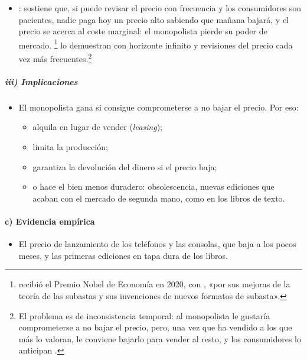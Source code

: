 \documentclass[11pt]{article}
\begin{document}
\begin{itemize}
\item {}: \textcite{Coase1972Durability} sostiene que, si puede revisar el precio con frecuencia y los consumidores son pacientes, nadie paga hoy un precio alto sabiendo que mañana bajará, y el precio se acerca al coste marginal: el monopolista pierde su poder de mercado. \textcite{GulSonnenscheinWilson1986Foundations}\footnote{ recibió el Premio Nobel de Economía en 2020, con , «por sus mejoras de la teoría de las subastas y sus invenciones de nuevos formatos de subasta»\nocite{Nobel2020MilgromWilson}.} lo demuestran con horizonte infinito y revisiones del precio cada vez más frecuentes.\footnote{El problema es de inconsistencia temporal: al monopolista le gustaría comprometerse a no bajar el precio, pero, una vez que ha vendido a los que más lo valoran, le conviene bajarlo para vender al resto, y los consumidores lo anticipan .}
\end{itemize}

\subparagraph{iii) Implicaciones}

\begin{itemize}
\item El monopolista gana si consigue comprometerse a no bajar el precio. Por eso:
  \begin{itemize}
  \item alquila en lugar de vender (\emph{leasing});
  \item limita la producción;
  \item garantiza la devolución del dinero si el precio baja;
  \item o hace el bien menos duradero: obsolescencia, nuevas ediciones que acaban con el mercado de segunda mano, como en los libros de texto\nocite{Bulow1982Durable}.
  \end{itemize}
\end{itemize}

\paragraph{c) Evidencia empírica}

\begin{itemize}
\item El precio de lanzamiento de los teléfonos y las consolas, que baja a los pocos meses, y las primeras ediciones en tapa dura de los libros.
\end{itemize}
\end{document}
